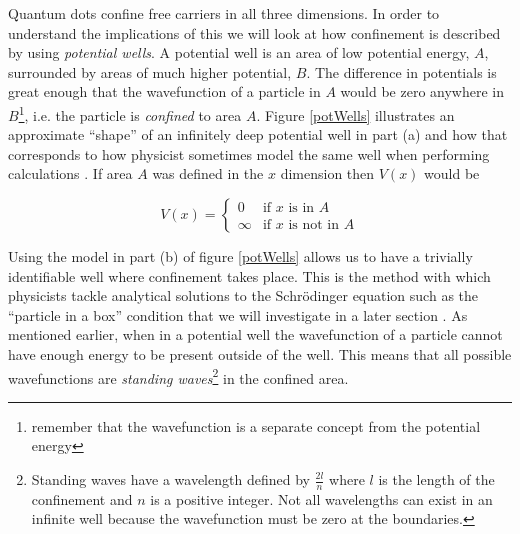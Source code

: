 \documentclass[authoryearcitations]{UoYCSproject}
\begin{document}
Quantum dots confine free carriers in all three dimensions. In order to understand the implications
of this we will look at how confinement is described by using \emph{potential wells}. A potential
well is an area of low potential energy, $A$, surrounded by areas of much higher potential, $B$. The difference 
in potentials is great enough that the wavefunction of a particle in $A$ would be zero anywhere in $B$\footnote{
remember that the wavefunction is a separate concept from the potential energy}, i.e.
the particle is \emph{confined} to area $A$. Figure \ref{potWells} illustrates an approximate ``shape'' of
an infinitely deep potential well in part (a) and how that corresponds to how physicist sometimes model
the same well when performing calculations \cite{dots, qp}. If area $A$ was defined in the $x$ dimension
then $V(x)$ would be

\begin{equation}
V(x) = \begin{cases}
          0 & \text{if $x$ is in $A$}  \\
          \infty    & \text{if $x$ is not in $A$} 
         \end{cases}
\label{vx}
\end{equation}


Using the model in part (b) of figure \ref{potWells} allows us to have a trivially identifiable well where confinement
takes place. This is the method with which physicists tackle analytical solutions to the Schr\"{o}dinger equation 
such as the ``particle in a box'' condition that we will investigate in a later section \cite{datta, qp, dots}.  
As mentioned earlier, when in a potential well the wavefunction of a particle cannot have enough energy to be present
outside of the well. This means that all possible wavefunctions are \emph{standing waves}\footnote{Standing
waves have a wavelength defined by $\frac{2l}{n}$ where $l$ is the length of the confinement and $n$ is a positive integer. 
Not all wavelengths can exist in an infinite well because the wavefunction must be zero at the boundaries.} in the confined area.
\end{document}
